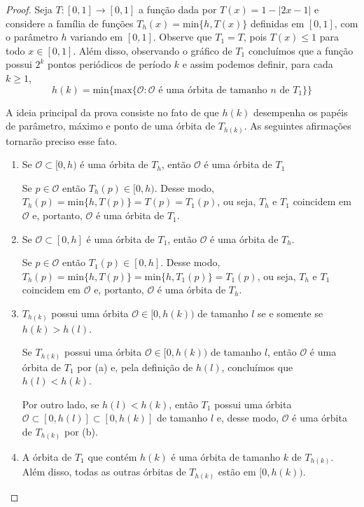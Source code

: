 \begin{proof}
Seja $T: [0,1] \to [0,1]$ a função dada por $T(x) = 1 - |2x - 1|$ e considere a família de funções $T_h(x) = \textrm{min}\{h, T(x)\}$ definidas em $[0,1]$, com o parâmetro $h$ variando em $[0,1]$. Observe que $T_1 = T$, pois $T(x) \leq 1$ para todo $x \in [0,1]$. Além disso, observando o gráfico de $T_1$ concluímos que a função possui $2^k$ pontos periódicos de período $k$ e assim podemos definir, para cada $k \geq 1$, $$h(k) = \textrm{min} \{ \textrm{max} \{ \mathcal{O} : \mathcal{O} \textrm{ é uma órbita de tamanho } n \textrm{ de } T_1\} \}$$

A ideia principal da prova consiste no fato de que $h(k)$ desempenha os papéis de parâmetro, máximo e ponto de uma órbita de $T_{h(k)}$. As seguintes afirmações tornarão preciso esse fato.

\begin{enumerate}[label = (\alph*)]
\item Se $\mathcal{O} \subset [0, h)$ é uma órbita de $T_h$, então $\mathcal{O}$ é uma órbita de $T_1$

Se $p \in \mathcal{O}$ então $T_h(p) \in [0, h)$. Desse modo, $T_h(p) = \textrm{min}\{h, T(p)\} = T(p) = T_1(p)$, ou seja, $T_h$ e $T_1$ coincidem em $\mathcal{O}$ e, portanto, $\mathcal{O}$ é uma órbita de $T_1$.

\item Se $\mathcal{O} \subset [0, h]$ é uma órbita de $T_1$, então $\mathcal{O}$ é uma órbita de $T_h$.

Se $p \in \mathcal{O}$ então $T_1(p) \in [0, h]$. Desse modo, $T_h(p) = \textrm{min}\{h, T(p)\} = \textrm{min}\{h, T_1(p)\} = T_1(p)$, ou seja, $T_h$ e $T_1$ coincidem em $\mathcal{O}$ e, portanto, $\mathcal{O}$ é uma órbita de $T_h$.

\item $T_{h(k)}$ possui uma órbita $\mathcal{O} \in [0, h(k))$ de tamanho $l$ se e somente se $h(k) > h(l)$.

Se $T_{h(k)}$ possui uma órbita $\mathcal{O} \in [0, h(k))$ de tamanho $l$, então $\mathcal{O}$ é uma órbita de $T_1$ por (a) e, pela definição de $h(l)$, concluímos que $h(l) < h(k)$.

Por outro lado, se $h(l) < h(k)$, então $T_1$ possui uma órbita $\mathcal{O} \subset [0, h(l)] \subset [0, h(k)]$ de tamanho $l$ e, desse modo, $\mathcal{O}$ é uma órbita de $T_{h(k)}$ por (b).

\item A órbita de $T_1$ que contém $h(k)$ é uma órbita de tamanho $k$ de $T_{h(k)}$. Além disso, todas as outras órbitas de $T_{h(k)}$ estão em $[0, h(k))$. 


\end{enumerate}
\end{proof}
